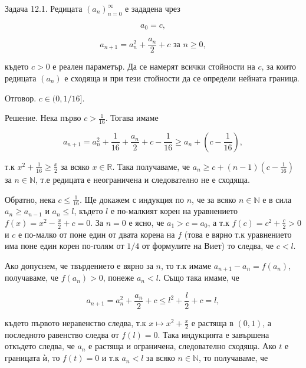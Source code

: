 
Задача 12.1. Редицата $(a_n)_{n=0}^{\infty}$ е зададена чрез

$$
a_0=c,
$$

$$
a_{n+1}=a_n^2+\frac{a_n}{2}+c\text{ за }n\geq0,
$$

където $c>0$ е реален параметър. Да се намерят всички стойности на $c$, за които редицата $(a_n)$ е сходяща и при тези стойности да се определи нейната граница.

Отговор. $c\in(0,1/16]$.

Решение. Нека първо $c>\frac1{16}$. Тогава имаме

$$a_{n+1}=a_n^2+\frac1{16}+\frac{a_n}{2}+c-\frac1{16}\geq a_n+\left(c-\frac1{16}\right),$$

т.к $x^2+\frac1{16}\geq\frac x2$ за всяко $x\in\mathbb R$. Така получаваме, че $a_n\geq c+(n-1)(c-\frac1{16})$ за $n\in\mathbb N$, т.е редицата е неограничена и следователно не е сходяща.

Обратно, нека $c\leq\frac1{16}$. Ще докажем с индукция по $n$, че за всяко $n\in\mathbb N$ е в сила $a_n\geq a_{n-1}$ и $a_n\leq l$, където $l$ е по-малкият корен на уравнението $f(x)=x^2-\frac x2+c=0$. За $n=0$ е ясно, че $a_1>c=a_0$, а т.к $f(c)=c^2+\frac c2>0$ и $c$ е по-малко от поне един от двата корена на $f$ (това е вярно т.к уравнението има поне един корен по-голям от $1/4$ от формулите на Виет) то следва, че $c<l$.

Ако допуснем, че твърдението е вярно за $n$, то т.к имаме $a_{n+1}-a_n=f(a_n)$, получаваме, че $f(a_n)>0$, понеже $a_n<l$. Също така имаме, че

$$a_{n+1}=a_n^2+\frac{a_n}{2}+c\leq l^2+\frac l2+c=l,$$

където първото неравенство следва, т.к $x\mapsto x^2+\frac x2$ е растяща в $(0,1)$, а последното равенство следва от $f(l)=0$. Така индукцията е завършена откъдето следва, че $a_n$ е растяща и ограничена, следователно сходяща. Ако $t$ е границата ѝ, то $f(t)=0$ и т.к $a_n<l$ за всяко $n\in\mathbb N$, то получаваме, че

